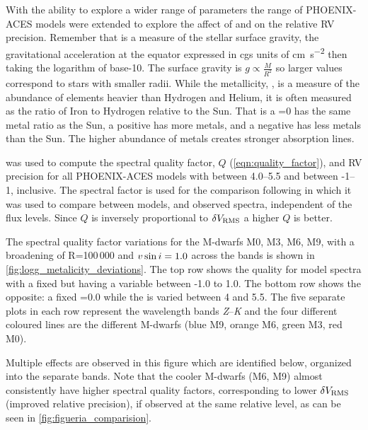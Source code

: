 With the ability to explore a wider range of parameters the range of {PHOENIX-ACES} models were extended to explore the affect of \Logg{} and \feh{} on the relative {RV} precision.
Remember that \Logg{} is a measure of the stellar surface gravity, the gravitational acceleration at the equator expressed in {cgs} units of \si{\centi\metre\per\second\squared} then taking the logarithm of base-10.
The surface gravity is \(g \propto \frac{M}{R^{2}}\) so larger \Logg{} values correspond to stars with smaller radii.
While the metallicity, \feh{}, is a measure of the abundance of elements heavier than Hydrogen and Helium, it is often measured as the ratio of Iron to Hydrogen relative to the Sun.
That is a \feh{}=0 has the same metal ratio as the Sun, a positive \feh{} has more metals, and a negative \feh{} has less metals than the Sun.
The higher abundance of metals creates stronger absorption lines.

\Eniric{} was used to compute the spectral quality factor, \(Q\) (\cref{eqn:quality_factor}), and {RV} precision for all {PHOENIX-ACES} models with \Logg{} between 4.0--5.5 and \feh{} between -1--1, inclusive.
The spectral factor is used for the comparison following \citet{artigau_optical_2018} in which it was used to compare between models, and observed spectra, independent of the flux levels.
Since \(Q\) is inversely proportional to \(\delta V_{\textrm{RMS}}\) a higher \(Q\) is better.

The spectral quality factor variations for the {M-dwarf}s {M0}, {M3}, {M6}, {M9}, with a broadening of R=100\,000 and $v\sin{i}=1.0$\kmps{} across the \nir{} bands is shown in \cref{fig:logg_metalicity_deviations}.
The top row shows the quality for model spectra with a fixed  but having a variable \feh{} between -1.0 to 1.0.
The bottom row shows the opposite: a fixed \feh{}=0.0 while the \Logg{} is varied between 4 and 5.5.
The five separate plots in each row represent the \nir{} wavelength bands \emph{Z}--\emph{K} and the four different coloured lines are the different M-dwarfs (blue {M9}, orange {M6}, green {M3}, red {M0}).

Multiple effects are observed in this figure which are identified below, organized into the separate bands.
Note that the cooler M-dwarfs (M6, {M9}) almost consistently have higher spectral quality factors, corresponding to lower \({\delta V_{\textrm{RMS}}{}}\) (improved relative precision), if observed at the same relative \snr{} level, as can be seen in \cref{fig:figueria_comparision}.


